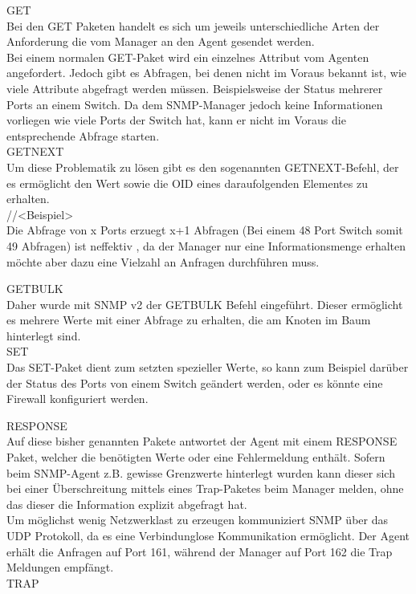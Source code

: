 GET\\

Bei den GET Paketen handelt es sich um jeweils unterschiedliche Arten der Anforderung die vom Manager an den Agent gesendet werden.\\
Bei einem normalen GET-Paket wird ein einzelnes Attribut vom Agenten angefordert. Jedoch gibt es Abfragen, bei denen nicht im Voraus bekannt ist, wie viele Attribute abgefragt werden müssen. Beispielsweise der Status mehrerer Ports an einem Switch. Da dem SNMP-Manager jedoch keine Informationen vorliegen wie viele Ports der Switch hat, kann er nicht im Voraus die entsprechende Abfrage starten.\\

GETNEXT\\

Um diese Problematik zu lösen gibt es den sogenannten GETNEXT-Befehl, der es ermöglicht den Wert sowie die OID eines daraufolgenden Elementes zu erhalten.\\
//<Beispiel>\\

Die Abfrage von x Ports erzuegt x+1 Abfragen (Bei einem 48 Port Switch somit 49 Abfragen) ist neffektiv , da der Manager nur eine Informationsmenge erhalten möchte aber dazu eine Vielzahl an Anfragen durchführen muss.

GETBULK\\
Daher wurde mit SNMP v2 der GETBULK Befehl eingeführt. Dieser ermöglicht es mehrere Werte mit einer Abfrage zu erhalten, die am Knoten im Baum hinterlegt sind.\\

SET\\
Das SET-Paket dient zum setzten spezieller Werte, so kann zum Beispiel darüber der Status des Ports von einem Switch  geändert werden, oder es könnte eine Firewall konfiguriert werden.

RESPONSE\\
Auf diese bisher genannten Pakete antwortet der Agent mit einem RESPONSE Paket, welcher die benötigten Werte oder eine Fehlermeldung enthält.
Sofern beim SNMP-Agent z.B. gewisse Grenzwerte hinterlegt wurden kann dieser sich bei einer Überschreitung mittels eines Trap-Paketes beim Manager melden, ohne das dieser die Information explizit abgefragt hat.\\
Um möglichst wenig Netzwerklast zu erzeugen kommuniziert SNMP über das UDP Protokoll, da es eine Verbindunglose Kommunikation ermöglicht. Der Agent erhält die Anfragen auf Port 161, während der Manager auf Port 162 die Trap Meldungen empfängt.\\
TRAP\\





